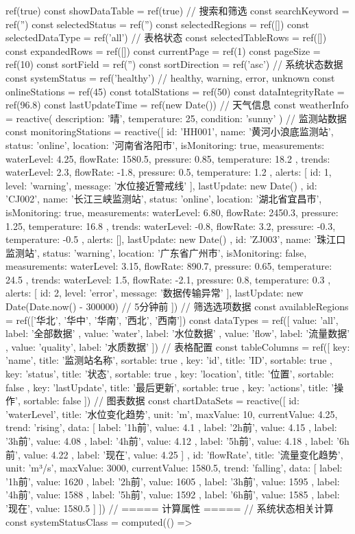 {{{{{ref(true) const showDataTable = ref(true) // 搜索和筛选 const searchKeyword = ref('') const selectedStatus = ref('') const selectedRegions = ref([]) const selectedDataType = ref('all') // 表格状态 const selectedTableRows = ref([]) const expandedRows = ref([]) const currentPage = ref(1) const pageSize = ref(10) const sortField = ref('') const sortDirection = ref('asc') // 系统状态数据 const systemStatus = ref('healthy') // healthy, warning, error, unknown const onlineStations = ref(45) const totalStations = ref(50) const dataIntegrityRate = ref(96.8) const lastUpdateTime = ref(new Date()) // 天气信息 const weatherInfo = reactive({ description: '晴', temperature: 25, condition: 'sunny' }) // 监测站数据 const monitoringStations = reactive([ { id: 'HH001', name: '黄河小浪底监测站', status: 'online', location: '河南省洛阳市', isMonitoring: true, measurements: { waterLevel: 4.25, flowRate: 1580.5, pressure: 0.85, temperature: 18.2 }, trends: { waterLevel: 2.3, flowRate: -1.8, pressure: 0.5, temperature: 1.2 }, alerts: [ { id: 1, level: 'warning', message: '水位接近警戒线' } ], lastUpdate: new Date() }, { id: 'CJ002', name: '长江三峡监测站', status: 'online', location: '湖北省宜昌市', isMonitoring: true, measurements: { waterLevel: 6.80, flowRate: 2450.3, pressure: 1.25, temperature: 16.8 }, trends: { waterLevel: -0.8, flowRate: 3.2, pressure: -0.3, temperature: -0.5 }, alerts: [], lastUpdate: new Date() }, { id: 'ZJ003', name: '珠江口监测站', status: 'warning', location: '广东省广州市', isMonitoring: false, measurements: { waterLevel: 3.15, flowRate: 890.7, pressure: 0.65, temperature: 24.5 }, trends: { waterLevel: 1.5, flowRate: -2.1, pressure: 0.8, temperature: 0.3 }, alerts: [ { id: 2, level: 'error', message: '数据传输异常' } ], lastUpdate: new Date(Date.now() - 300000) // 5分钟前 } ]) // 筛选选项数据 const availableRegions = ref(['华北', '华中', '华南', '西北', '西南']) const dataTypes = ref([ { value: 'all', label: '全部数据' }, { value: 'water', label: '水位数据' }, { value: 'flow', label: '流量数据' }, { value: 'quality', label: '水质数据' } ]) // 表格配置 const tableColumns = ref([ { key: 'name', title: '监测站名称', sortable: true }, { key: 'id', title: 'ID', sortable: true }, { key: 'status', title: '状态', sortable: true }, { key: 'location', title: '位置', sortable: false }, { key: 'lastUpdate', title: '最后更新', sortable: true }, { key: 'actions', title: '操作', sortable: false } ]) // 图表数据 const chartDataSets = reactive([ { id: 'waterLevel', title: '水位变化趋势', unit: 'm', maxValue: 10, currentValue: 4.25, trend: 'rising', data: [ { label: '1h前', value: 4.1 }, { label: '2h前', value: 4.15 }, { label: '3h前', value: 4.08 }, { label: '4h前', value: 4.12 }, { label: '5h前', value: 4.18 }, { label: '6h前', value: 4.22 }, { label: '现在', value: 4.25 } ] }, { id: 'flowRate', title: '流量变化趋势', unit: 'm³/s', maxValue: 3000, currentValue: 1580.5, trend: 'falling', data: [ { label: '1h前', value: 1620 }, { label: '2h前', value: 1605 }, { label: '3h前', value: 1595 }, { label: '4h前', value: 1588 }, { label: '5h前', value: 1592 }, { label: '6h前', value: 1585 }, { label: '现在', value: 1580.5 } ] } ]) // ===== 计算属性 ===== // 系统状态相关计算 const systemStatusClass = computed(() => }}}}}
